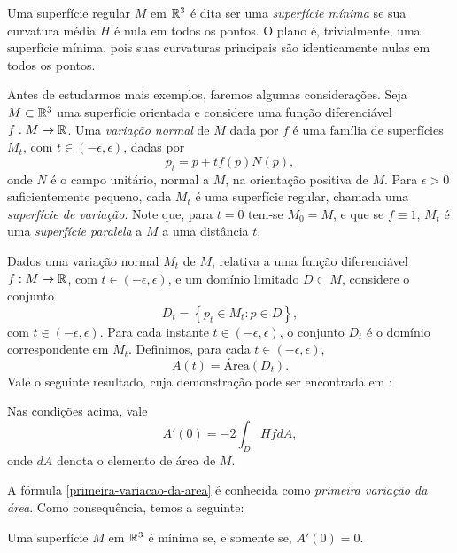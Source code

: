 Uma superfície regular $M$ em $\mathbb{R}^3$ é dita ser uma \emph{superfície mínima} se sua curvatura média $H$ é nula em todos os pontos. O plano é, trivialmente, uma superfície mínima, pois suas curvaturas principais são identicamente nulas em todos os pontos.

Antes de estudarmos mais exemplos, faremos algumas considerações. Seja $M \subset \mathbb{R}^3$ uma superfície orientada e considere uma função diferenciável $f: M \rightarrow \mathbb{R}$. Uma \emph{variação normal} de $M$ dada por $f$ é uma família de superfícies $M_t$, com $t \in (-\epsilon,\epsilon)$, dadas por
\begin{equation*}
	p_t = p + t f(p) N(p),
\end{equation*}
onde $N$ é o campo unitário, normal a $M$, na orientação positiva de $M$. Para $\epsilon > 0$ suficientemente pequeno, cada $M_t$ é uma superfície regular, chamada uma \emph{superfície de variação}. Note que, para $t=0$ tem-se $M_0 = M$, e que se $f \equiv 1$, $M_t$ é uma \emph{superfície paralela} a $M$ a uma distância $t$.

Dados uma variação normal $M_t$ de $M$, relativa a uma função diferenciável $f: M \rightarrow \mathbb{R}$, com $t \in (-\epsilon,\epsilon)$, e um domínio limitado $D \subset M$, considere o conjunto
\begin{equation*}
	D_t = \left\{ p_t \in M_t: p \in D \right\},
\end{equation*}
com $t \in (-\epsilon,\epsilon)$. Para cada instante $t \in (-\epsilon,\epsilon)$, o conjunto $D_t$ é o domínio correspondente em $M_t$. Definimos, para cada $t \in (-\epsilon,\epsilon)$,
\begin{equation*}
	A(t) = \text{Área} (D_t).
\end{equation*}
Vale o seguinte resultado, cuja demonstração pode ser encontrada em \cite{Nitsche2011}:

\begin{teorema}
	Nas condições acima, vale
	\begin{equation}\label{primeira-variacao-da-area}
		A'(0) = -2 \int_D H f dA,
	\end{equation}
	onde $dA$ denota o elemento de área de $M$.
\end{teorema}

A fórmula \eqref{primeira-variacao-da-area} é conhecida como \emph{primeira variação da área}. Como consequência, temos a seguinte:

\begin{proposicao}\label{superficie-minima-como-ponto-critico-do-funcional-da-area}
	Uma superfície $M$ em $\mathbb{R}^3$ é mínima se, e somente se, $A'(0)=0$.
\end{proposicao}

